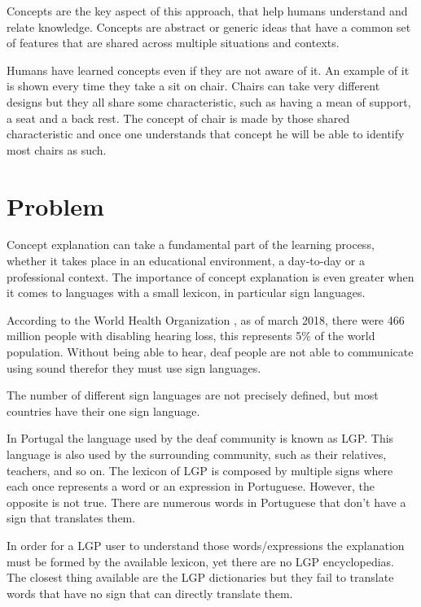 Concepts are the key aspect of this approach, that help humans understand and relate knowledge.
Concepts are abstract or generic ideas that have a common set of features that are shared across multiple situations and contexts.

Humans have learned concepts even if they are not aware of it.
An example of it is shown every time they take a sit on chair.
Chairs can take very different designs but they all share some characteristic, such as having a mean of support, a seat and a back rest.
The concept of chair is made by those shared characteristic and once one understands that concept he will be able to identify most chairs as such.

\section{Problem}

Concept explanation can take a fundamental part of the learning process\cite{ghorbani2019towards}, whether it takes place in an educational environment, a day-to-day or a professional context.
The importance of concept explanation is even greater when it comes to languages with a small lexicon, in particular sign languages.

According to the World Health Organization \cite{who2018}, as of march 2018, there were 466 million people with disabling hearing loss, this represents 5\% of the world population.
Without being able to hear, deaf people are not able to communicate using sound therefor they must use sign languages.

The number of different sign languages are not precisely defined, but most countries have their one sign language.

In Portugal the language used by the deaf community is known as \gls{LGP}.
This language is also used by the surrounding community, such as their relatives, teachers, and so on.
The lexicon of \gls{LGP} is composed by multiple signs where each once represents a word or an expression in Portuguese.
However, the opposite is not true.
There are numerous words in Portuguese that don't have a sign that translates them.

In order for a \gls{LGP} user to understand those words/expressions the explanation must be formed by the available lexicon\cite{musselman2000children}, yet there are no \gls{LGP} encyclopedias.
The closest thing available are the \gls{LGP} dictionaries but they fail to translate words that have no sign that can directly translate them.

